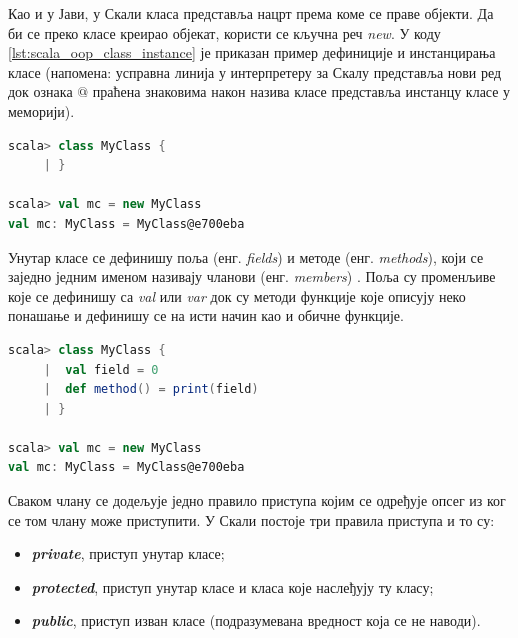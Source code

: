 \documentclass[12pt,oneside]{memoir}
\begin{document}
Као и у Јави, у Скали класа представља нацрт према коме се праве објекти. Да би се преко класе креирао објекат, користи се кључна реч \textit{new}. У коду \ref{lst:scala_oop_class_instance} је приказан  пример дефиниције и инстанцирања класе (напомена: усправна линија у интерпретеру за Скалу представља нови ред док ознака $@$ праћена знаковима након назива класе представља инстанцу класе у меморији).

\begin{lstlisting}[language=Scala, caption={Дефиниција и инстанцирање класе у Скали}, label={lst:scala_oop_class_instance}, basicstyle=\small]
scala> class MyClass {
     | }

scala> val mc = new MyClass
val mc: MyClass = MyClass@e700eba
\end{lstlisting}

Унутар класе се дефинишу поља (енг. \textit{fields}) и методе (енг. \textit{methods}), који се заједно једним именом називају чланови (енг. \textit{members}) \cite{scala_prog}. Поља су променљиве које се дефинишу са \textit{val} или \textit{var} док су методи функције које описују неко понашање и дефинишу се на исти начин као и обичне функције.

\begin{lstlisting}[language=Scala, caption={Чланови класе}, label={lst:scala_oop_members_class}, basicstyle=\small]
scala> class MyClass {
     |  val field = 0
     |  def method() = print(field)
     | }

scala> val mc = new MyClass
val mc: MyClass = MyClass@e700eba

\end{lstlisting}

%

Сваком члану се додељује једно правило приступа којим се одређује опсег из ког се том члану може приступити. У Скали постоје три правила приступа и то су:

\begin{itemize}
\item \textbf{\textit{private}}, приступ унутар класе;
\item \textbf{\textit{protected}}, приступ унутар класе и класа које наслеђују ту класу;
\item \textbf{\textit{public}}, приступ изван класе (подразумевана вредност која се не наводи).
\end{itemize}

%
%
\end{document}
